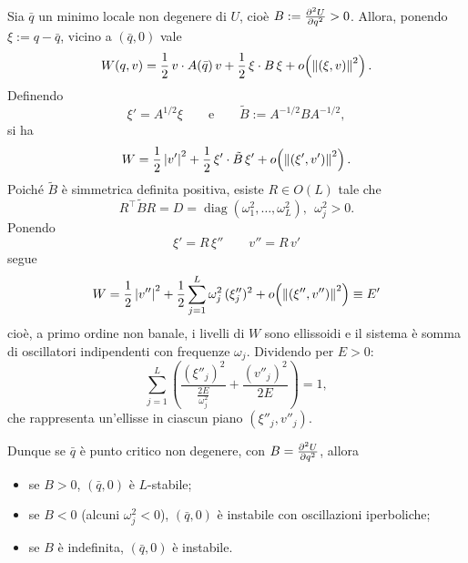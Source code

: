 \begin{proposition}
Sia $\bar{q}$ un minimo locale non degenere di $U$, cioè $B:=\pdv[2]{U}{q}(\bar{q})>0$. Allora, ponendo $\xi:=q-\bar{q}$, vicino a $(\bar{q},0)$ vale
\begin{equation}
    W(q,v)=\frac{1}{2}\,v\cdot A(\bar{q})\,v+\frac{1}{2}\,\xi\cdot B\,\xi+o\!\left(\norm{(\xi,v)}^2\right).
\end{equation}
Definendo
\begin{equation}
    \xi'=A^{1/2}\xi \qquad\text{e}\qquad \tilde{B}:=A^{-1/2}BA^{-1/2},
\end{equation}
si ha
\begin{equation}
    W=\frac{1}{2}\,\abs{v'}^2+\frac{1}{2}\,\xi'\cdot \tilde{B}\,\xi'+o\!\left(\norm{(\xi',v')}^2\right).
\end{equation}
Poiché $\tilde{B}$ è simmetrica definita positiva, esiste $R\in O(L)$ tale che
\begin{equation}
    R^\intercal \tilde{B} R=D=\operatorname{diag}(\omega_1^2,\dots,\omega_L^2),\ \ \omega_j^2>0.
\end{equation}
Ponendo
\begin{equation}
    \xi'=R\,\xi'' \qquad v''=R\,v'
\end{equation}
segue
\begin{equation}
    W=\frac{1}{2}\,\abs{v''}^2+\frac{1}{2}\sum_{j=1}^{L}\omega_j^2\,(\xi''_j)^2+o\!\left(\norm{(\xi'',v'')}^2\right)\equiv E'
\end{equation}
cioè, a primo ordine non banale, i livelli di $W$ sono ellissoidi e il sistema è somma di oscillatori indipendenti con frequenze $\omega_j$.
Dividendo per $E>0$:
\begin{equation}
    \sum_{j=1}^{L}\left( \frac{(\xi''_j)^2}{\tfrac{2E}{\omega_j^2}} + \frac{(v''_j)^2}{2E} \right)=1,
\end{equation}
che rappresenta un’ellisse in ciascun piano $(\xi''_j,v''_j)$.


Dunque se $\bar{q}$ è punto critico non degenere, con $B=\pdv[2]{U}{q}(\bar{q})$, allora
\begin{itemize}
    \item se $B>0$, $(\bar{q},0)$ è $L$-stabile;
    \item se $B<0$ (alcuni $\omega_j^2<0$), $(\bar{q},0)$ è instabile con oscillazioni iperboliche;
    \item se $B$ è indefinita, $(\bar{q},0)$ è instabile.
\end{itemize}

\end{proposition}